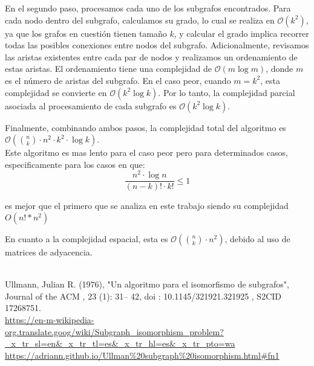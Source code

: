 \documentclass[12pt,a4paper]{article}
\begin{document}
En el segundo paso, procesamos cada uno de los subgrafos encontrados. Para cada nodo dentro del subgrafo, calculamos su grado, lo cual se realiza en \( \mathcal{O}(k^2) \), ya que los grafos en cuestión tienen tamaño \( k \), y calcular el grado implica recorrer todas las posibles conexiones entre nodos del subgrafo. Adicionalmente, revisamos las aristas existentes entre cada par de nodos y realizamos un ordenamiento de estas aristas. El ordenamiento tiene una complejidad de \( \mathcal{O}(m \log m) \), donde \( m \) es el número de aristas del subgrafo. En el caso peor, cuando \( m = k^2 \), esta complejidad se convierte en \( \mathcal{O}(k^2 \log k) \). Por lo tanto, la complejidad parcial asociada al procesamiento de cada subgrafo es \( \mathcal{O}(k^2 \log k) \).

Finalmente, combinando ambos pasos, la complejidad total del algoritmo es \( \mathcal{O}\left(\binom{n}{k} \cdot n^2 \cdot k^2 \cdot \log k\right) \).
\\
Este algoritmo es mas lento para el caso peor pero para determinados casos, especificamente para los casos en que:
\[
\frac{n^2 \cdot \log n}{(n-k)! \cdot k!} \leq 1
\]

es mejor que el primero que se analiza en este trabajo siendo su complejidad $O(n!*n^2)$


En cuanto a la complejidad espacial, esta es \( \mathcal{O}\left(\binom{n}{k} \cdot n^2\right) \), debido al uso de matrices de adyacencia.




\\
Ullmann, Julian R. (1976), "Un algoritmo para el isomorfismo de subgrafos", Journal of the ACM , 23 (1): 31– 42, doi : 10.1145/321921.321925 , S2CID  17268751.
\\
\url{https://en-m-wikipedia-org.translate.goog/wiki/Subgraph_isomorphism_problem?_x_tr_sl=en&_x_tr_tl=es&_x_tr_hl=es&_x_tr_pto=wa}
\\
\url {https://adriann.github.io/Ullman%20subgraph%20isomorphism.html#fn1}
\\
\end{document}
